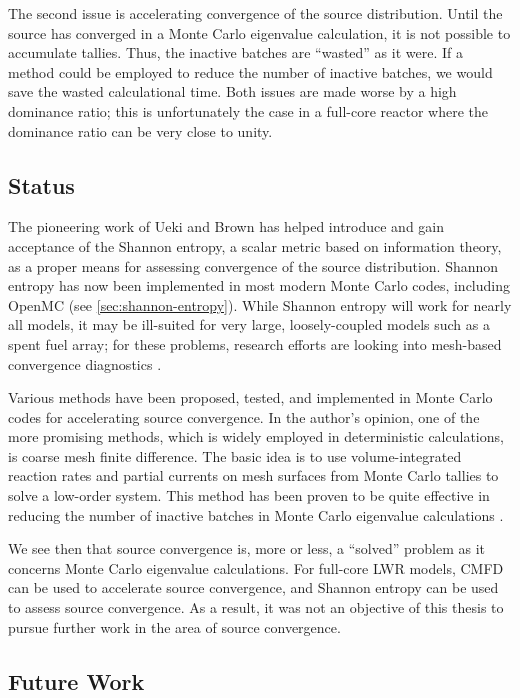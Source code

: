 The second issue is accelerating convergence of the source distribution. Until
the source has converged in a Monte Carlo eigenvalue calculation, it is not
possible to accumulate tallies. Thus, the inactive batches are ``wasted'' as it
were. If a method could be employed to reduce the number of inactive batches, we
would save the wasted calculational time. Both issues are made worse by a high
dominance ratio; this is unfortunately the case in a full-core reactor where the
dominance ratio can be very close to unity.

\subsection{Status}

The pioneering work of Ueki and Brown \cite{trans-ueki-2002, physor-brown-2006}
has helped introduce and gain acceptance of the Shannon entropy, a scalar metric
based on information theory, as a proper means for assessing convergence of the
source distribution. Shannon entropy has now been implemented in most modern
Monte Carlo codes, including OpenMC (see \autoref{sec:shannon-entropy}). While
Shannon entropy will work for nearly all models, it may be ill-suited for very
large, loosely-coupled models such as a spent fuel array; for these problems,
research efforts are looking into mesh-based convergence diagnostics
\cite{mc-she-2011}.

Various methods have been proposed, tested, and implemented in Monte Carlo codes
for accelerating source convergence. In the author's opinion, one of the more
promising methods, which is widely employed in deterministic calculations, is
coarse mesh finite difference. The basic idea is to use volume-integrated
reaction rates and partial currents on mesh surfaces from Monte Carlo tallies to
solve a low-order system. This method has been proven to be quite effective in
reducing the number of inactive batches in Monte Carlo eigenvalue
calculations \cite{physor-lee-2012}.

We see then that source convergence is, more or less, a ``solved'' problem as it
concerns Monte Carlo eigenvalue calculations. For full-core LWR models, CMFD can
be used to accelerate source convergence, and Shannon entropy can be used to
assess source convergence. As a result, it was not an objective of this thesis
to pursue further work in the area of source convergence.

\subsection{Future Work}

